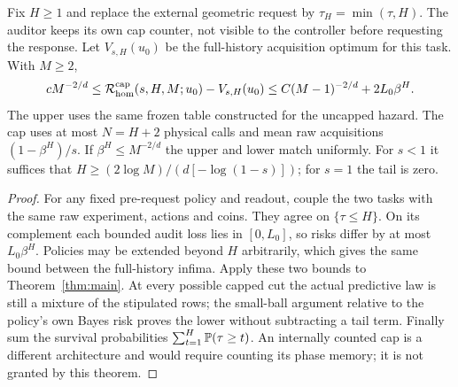 \begin{theorem}\label{thm:cap}
Fix $H\ge1$ and replace the external geometric request by $\tau_H=\min(\tau,H)$. The auditor keeps its own cap counter, not visible to the controller before requesting the response. Let $V_{s,H}(u_0)$ be the full-history acquisition optimum for this task. With $M\ge2$,
\begin{equation}\label{eq:cap-law}
 cM^{-2/d}\le\mathcal R_{\rm hom}^{\rm cap}(s,H,M;u_0)-V_{s,H}(u_0)
 \le C(M-1)^{-2/d}+2L_0\beta^H.
\end{equation}
The upper uses the same frozen table constructed for the uncapped hazard. The cap uses at most $N=H+2$ physical calls and mean raw acquisitions $(1-\beta^H)/s$. If $\beta^H\le M^{-2/d}$ the upper and lower match uniformly. For $s<1$ it suffices that
$H\ge (2\log M)/(d[-\log(1-s)])$; for $s=1$ the tail is zero.
\end{theorem}
\begin{proof}
For any fixed pre-request policy and readout, couple the two tasks with the same raw experiment, actions and coins. They agree on $\{\tau\le H\}$. On its complement each bounded audit loss lies in $[0,L_0]$, so risks differ by at most $L_0\beta^H$. Policies may be extended beyond $H$ arbitrarily, which gives the same bound between the full-history infima. Apply these two bounds to Theorem~\ref{thm:main}. At every possible capped cut the actual predictive law is still a mixture of the stipulated rows; the small-ball argument relative to the policy's own Bayes risk proves the lower without subtracting a tail term. Finally sum the survival probabilities $\sum_{t=1}^H\mathbb P(\tau\ge t)$. An internally counted cap is a different architecture and would require counting its phase memory; it is not granted by this theorem.
\end{proof}

